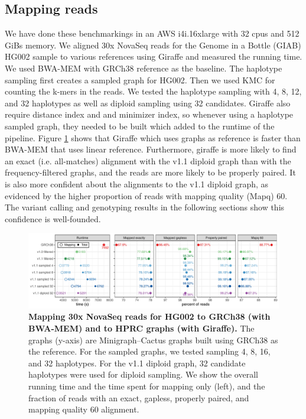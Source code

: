 \documentclass[11pt]{ucthesis}
\begin{document}
\subsection{Mapping reads}
We have done these benchmarkings in an AWS i4i.16xlarge with 32 cpus and 512 GiBs memory. We aligned 30x NovaSeq reads \cite{baid2020extensive} for the Genome in a Bottle (GIAB) \cite{wagner2022benchmarking} HG002 sample to various references using Giraffe and measured the running time. We used BWA-MEM \cite{li2013aligning} with GRCh38 reference as the baseline. The haplotype sampling first creates a sampled graph for HG002. Then we used KMC for counting the k-mers in the reads. We tested the haplotype sampling with 4, 8, 12, and 32 haplotypes as well as diploid sampling using 32 candidates. Giraffe also require distance index and and minimizer index, so whenever using a haplotype sampled graph, they needed to be built which added to the runtime of the pipeline. Figure \ref{fig:1:2} shows that Giraffe which uses graphs as reference is faster than BWA-MEM that uses linear reference. Furthermore, giraffe is more likely to find an exact (i.e. all-matches) alignment with the v1.1 diploid graph than with the frequency-filtered graphs, and the reads are more likely to be properly paired. It is also more confident about the alignments to the v1.1 diploid graph, as evidenced by the higher proportion of reads with mapping quality (Mapq) 60. The variant calling and genotyping results in the following sections show this confidence is well-founded.

\begin{figure}[h]
    \centering
    \includegraphics[width=\linewidth]{Images/figure2.pdf}
    \caption[Mapping 30x NovaSeq reads for HG002 to GRCh38 (with BWA-MEM) and to HPRC graphs (with Giraffe)]{\textbf{Mapping 30x NovaSeq reads for HG002 to GRCh38 (with BWA-MEM) and to HPRC graphs (with Giraffe).} The graphs (y-axis) are Minigraph–Cactus graphs built using GRCh38 as the
reference. For the sampled graphs, we tested sampling 4, 8, 16, and 32 haplotypes. For the v1.1 diploid
graph, 32 candidate haplotypes were used for diploid sampling. We show the overall running time and the
time spent for mapping only (left), and the fraction of reads with an exact, gapless, properly paired, and
mapping quality 60 alignment.}
    \label{fig:1:2}
\end{figure}
\end{document}
